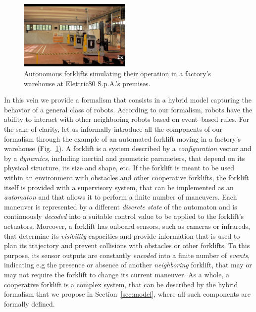 \documentclass[journal, onecolumn, 12pt]{styles/IEEEtran}
\begin{document}
%
\begin{figure}[!]
\centering
\includegraphics[width=0.48\textwidth,clip]{images/viano11.png}
\caption{Autonomous forklifts simulating their operation in a factory's warehouse at Elettric80 S.p.A.'s premises.}
\label{fig:viano:scenario}
\end{figure}
%

In this vein we provide a formalism that consists in a hybrid model capturing the behavior of a general class of robots. According to our formalism, robots have the ability to interact with other neighboring robots based on event--based rules. For the sake of clarity, let us informally introduce all the components of our formalism through the example of an automated forklift moving in a factory's warehouse (Fig.~\ref{fig:viano:scenario}). A forklift is a system described by a {\em configuration} vector and by a {\em dynamics}, including inertial and geometric parameters, that depend on its physical structure, its size and shape, etc. If the forklift is meant to be used within an environment with obstacles and other cooperative forklifts, the forklift itself is provided with a supervisory system, that can be implemented as an {\em automaton} and that allows it to perform a finite number of maneuvers. Each maneuver is represented by a different {\em discrete state} of the automaton and is continuously {\em decoded} into a suitable control value to be applied to the forklift's actuators. Moreover, a forklift has onboard sensors, such as cameras or infrareds, that determine its {\em visibility} capacities and provide information that is used to plan its trajectory and prevent collisions with obstacles or other forklifts. To this purpose, its sensor outputs are constantly {\em encoded} into a finite number of {\em events}, indicating e.g the presence or absence of another {\em neighboring} forklift, that may or may not require the forklift to change its current maneuver. As a whole, a cooperative forklift is a complex system, that can be described by the hybrid formalism that we propose in Section~\ref{sec:model}, where all such components are formally defined.
\end{document}
